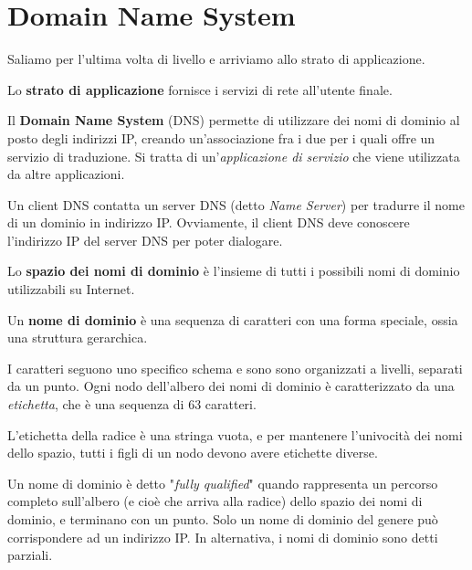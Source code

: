 \section{Domain Name System}

    Saliamo per l'ultima volta di livello e arriviamo allo strato di applicazione.
    
    \vspace{3mm}
    
    Lo \textbf{strato di applicazione} fornisce i servizi di rete all'utente finale.
    
    \vspace{3mm}
    
    Il \textbf{Domain Name System} (DNS) permette di utilizzare dei nomi di dominio al posto degli indirizzi IP, creando un'associazione fra i due per i quali offre un servizio di traduzione. Si tratta di un'\textit{applicazione di servizio} che viene utilizzata da altre applicazioni.
    
    Un client DNS contatta un server DNS (detto \textit{Name Server}) per tradurre il nome di un dominio in indirizzo IP. Ovviamente, il client DNS deve conoscere l'indirizzo IP del server DNS per poter dialogare.
    
    \vspace{3mm}
    
    Lo \textbf{spazio dei nomi di dominio} è l'insieme di tutti i possibili nomi di dominio utilizzabili su Internet. 
    
    Un \textbf{nome di dominio} è una sequenza di caratteri con una forma speciale, ossia una struttura gerarchica. 
    
    \vspace{3mm}
    
    I caratteri seguono uno specifico schema e sono sono organizzati a livelli, separati da un punto. Ogni nodo dell'albero dei nomi di dominio è caratterizzato da una \textit{etichetta}, che è una sequenza di 63 caratteri. 
    
    \vspace{3mm}
    
    L'etichetta della radice è una stringa vuota, e per mantenere l'univocità dei nomi dello spazio, tutti i figli di un nodo devono avere etichette diverse. 
    
    \vspace{3mm}
    
    Un nome di dominio è detto "\textit{fully qualified}" quando rappresenta un percorso completo sull'albero (e cioè che arriva alla radice) dello spazio dei nomi di dominio, e terminano con un punto. Solo un nome di dominio del genere può corrispondere ad un indirizzo IP. In alternativa, i nomi di dominio sono detti parziali.
    
